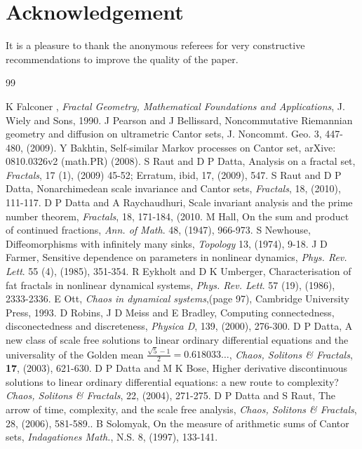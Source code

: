 \documentclass[12pt]{article}
\begin{document}
\section*{Acknowledgement}

It is a pleasure to thank the anonymous referees for very constructive recommendations to improve the quality of the paper.

\begin{thebibliography}{99}

 K Falconer , {\em Fractal Geometry, Mathematical Foundations and Applications}, J. Wiely and Sons, 1990.
 J Pearson  and J Bellissard, Noncommutative Riemannian geometry and diffusion on ultrametric  Cantor sets, J. Noncommt. Geo. 3, 447-480, (2009).
 Y Bakhtin, Self-similar Markov processes on Cantor set, arXive: 0810.0326v2 (math.PR) (2008).
 S Raut and D P Datta, Analysis on a fractal set, {\em Fractals}, 17 (1), (2009) 45-52; Erratum, ibid, 17,  (2009), 547.
 S Raut and D P Datta, Nonarchimedean scale invariance and Cantor sets, {\em Fractals}, 18, (2010), 111-117.
 D P Datta  and A Raychaudhuri, Scale invariant analysis and the prime number theorem, {\em Fractals}, 18, 171-184, (2010.
 M Hall, On the sum and product of continued fractions, {\em Ann. of Math}. 48, (1947), 966-973.
 S Newhouse, Diffeomorphisms with infinitely many sinks, {\em Topology} 13, (1974), 9-18.
 J D Farmer, Sensitive dependence on parameters in nonlinear dynamics, {\em Phys. Rev. Lett}. 55 (4), (1985), 351-354.
 R Eykholt and D K Umberger, Characterisation of fat fractals in nonlinear dynamical systems, {\em Phys. Rev. Lett}. 57 (19), (1986), 2333-2336.
 E Ott, {\em Chaos in dynamical systems},(page 97), Cambridge University Press, 1993.
 D Robins, J D Meiss and E Bradley, Computing connectedness, disconectedness and discreteness, {\em Physica D}, 139, (2000), 276-300.
 D P Datta, A new class of scale free solutions to linear ordinary 
differential equations and the universality of the Golden mean 
${\frac{\sqrt{5}-1}{2}}=0.618033 \ldots$, {\em Chaos, Solitons \& Fractals}, {\bf 17},      (2003), 621-630.
 D P Datta and M K Bose, Higher derivative discontinuous solutions to 
linear ordinary differential equations: a new route to complexity? \emph{Chaos, Solitons \& Fractals}, 22, (2004), 271-275.
 D P Datta  and S Raut, The arrow of time, complexity, and the scale free analysis, \emph{Chaos, Solitons \& Fractals}, 28, (2006), 581-589..
 B Solomyak, On the measure of arithmetic sums of Cantor sets, {\em Indagationes Math.}, N.S. 8, (1997), 133-141.
\end{thebibliography}
\end{document}
